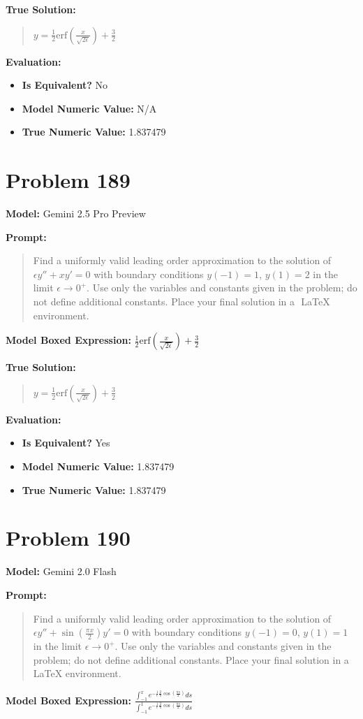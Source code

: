 \documentclass{article}
\begin{document}
{\textbf{True Solution:}
\begin{quote}
$y = \frac{1}{2} \text{erf}\left(\frac{x}{\sqrt{2\epsilon}}\right) + \frac{3}{2}$
\end{quote}

\textbf{Evaluation:}
\begin{itemize}
\item \textbf{Is Equivalent?} No
\item \textbf{Model Numeric Value:} N/A
\item \textbf{True Numeric Value:} 1.837479
\end{itemize}
\vspace{1cm}
\section*{Problem 189}
\textbf{Model:} Gemini 2.5 Pro Preview

\textbf{Prompt:}
\begin{quote}
Find a uniformly valid leading order approximation to the solution of $\epsilon y'' + x y' = 0$ with boundary conditions $y(-1) = 1$, $y(1) = 2$ in the limit $\epsilon \to 0^+$. Use only the variables and constants given in the problem; do not define additional constants. Place your final solution in a $\boxed{}$ LaTeX environment.
\end{quote}
\textbf{Model Boxed Expression:} $\frac{1}{2}\text{erf}\left(\frac{x}{\sqrt{2\epsilon}}\right) + \frac{3}{2}$

\textbf{True Solution:}
\begin{quote}
$y = \frac{1}{2} \text{erf}\left(\frac{x}{\sqrt{2\epsilon}}\right) + \frac{3}{2}$
\end{quote}

\textbf{Evaluation:}
\begin{itemize}
\item \textbf{Is Equivalent?} Yes
\item \textbf{Model Numeric Value:} 1.837479
\item \textbf{True Numeric Value:} 1.837479
\end{itemize}
\vspace{1cm}
\section*{Problem 190}
\textbf{Model:} Gemini 2.0 Flash

\textbf{Prompt:}
\begin{quote}
Find a uniformly valid leading order approximation to the solution of $\epsilon y'' + \sin\left(\frac{\pi x}{2}\right) y' = 0$ with boundary conditions $y(-1) = 0$, $y(1) = 1$ in the limit $\epsilon \to 0^+$. Use only the variables and constants given in the problem; do not define additional constants. Place your final solution in a $\boxed{}$ LaTeX environment.
\end{quote}
\textbf{Model Boxed Expression:} $\frac{\int_{-1}^x e^{-\frac{1}{\epsilon} \frac{2}{\pi} \cos(\frac{\pi s}{2})} ds}{\int_{-1}^1 e^{-\frac{1}{\epsilon} \frac{2}{\pi} \cos(\frac{\pi s}{2})} ds}$

}
\end{document}
